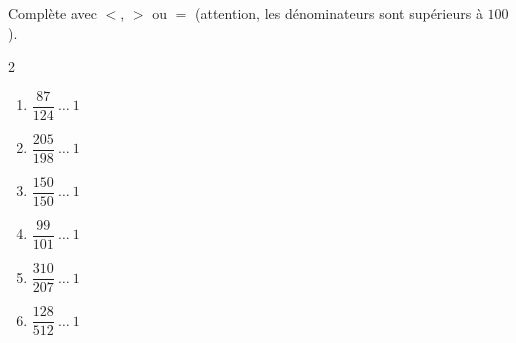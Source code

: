 \documentclass[11pt]{article}
\begin{document}
\begin{exercice}
Complète avec $<$, $>$ ou $=$ (attention, les dénominateurs sont supérieurs à $100$).
\begin{multicols}{2}
\begin{enumerate}[itemsep=1em]
\item $\dfrac{87}{124} \ \ldots \ 1$
\item $\dfrac{205}{198} \ \ldots \ 1$
\item $\dfrac{150}{150} \ \ldots \ 1$
\item $\dfrac{99}{101} \ \ldots \ 1$
\item $\dfrac{310}{207} \ \ldots \ 1$
\item $\dfrac{128}{512} \ \ldots \ 1$
\end{enumerate}
\end{multicols}
\end{exercice}
\end{document}
